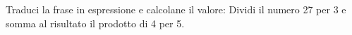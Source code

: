 \item Traduci la frase in espressione e calcolane il valore: Dividi il numero 27 per 3 e somma al risultato il prodotto di 4 per 5.